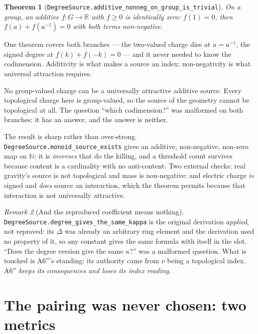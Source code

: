 \documentclass[11pt,a4paper]{article}
\newtheorem{theorem}{Theorem}[section]
\theoremstyle{definition}
\theoremstyle{remark}
\newtheorem{remark}[theorem]{Remark}
\newcommand{\lean}[1]{\texttt{\small #1}}
\newcommand{\App}{\ensuremath{\mathrm{A6}''}}
\begin{document}
\begin{theorem}[\lean{DegreeSource.additive\_nonneg\_on\_group\_is\_trivial}]
On a \emph{group}, an additive $f\colon G\to\mathbb{R}$ with $f\geq0$ is
identically zero: $f(1)=0$, then $f(a)+f(a^{-1})=0$ with both terms non-negative.
\end{theorem}

One theorem covers both branches --- the two-valued charge dies at $a=a^{-1}$, the
signed degree at $f(k)+f(-k)=0$ --- and it never needed to know the codimension.
Additivity is what makes a source an index; non-negativity is what universal
attraction requires.

\begin{claimbox}
No group-valued charge can be a universally attractive additive source. Every
topological charge here is group-valued, so the source of the geometry cannot be
topological at all. The question ``which codimension?'' was malformed on both
branches: it has an answer, and the answer is neither.
\end{claimbox}

The result is sharp rather than over-strong.
\lean{DegreeSource.monoid\_source\_exists} gives an additive, non-negative,
non-zero map on $\mathbb{N}$: it is \emph{inverses} that do the killing, and a
threshold count survives because content is a cardinality with no anti-content. Two
external checks: real gravity's source is not topological and mass is non-negative;
and electric charge \emph{is} signed and \emph{does} source an interaction, which
the theorem permits because that interaction is not universally attractive.

\begin{remark}[And the reproduced coefficient means nothing]
\lean{DegreeSource.degree\_gives\_the\_same\_kappa} is the original derivation
\emph{applied}, not reproved: its $\Delta$ was already an arbitrary ring element
and the derivation used no property of it, so any constant gives the same formula
with itself in the slot. ``Does the degree version give the same $\kappa$?'' was a
malformed question. What is touched is \App{}'s standing: its authority came from
$\nu$ being a topological index. \emph{\App{} keeps its consequences and loses its
index reading.}
\end{remark}

\section{The pairing was never chosen: two metrics}
\label{sec:twometrics}
\end{document}
